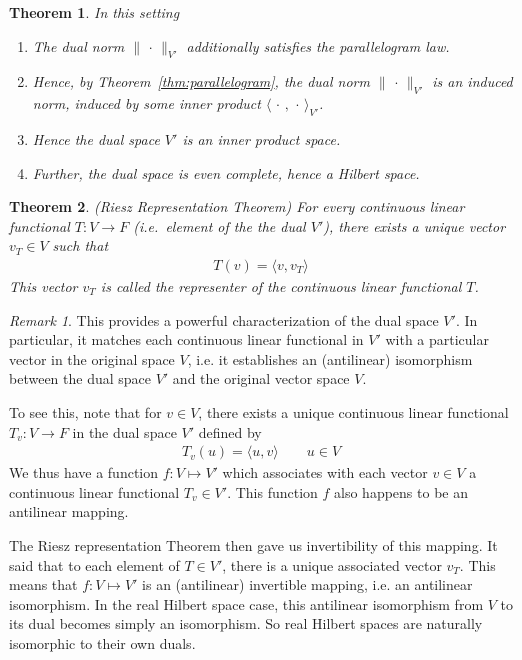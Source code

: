 \documentclass[12pt]{book}
\numberwithin{equation}{section} %
\theoremstyle{plain}
\newtheorem{thm}{Theorem}[section]
\theoremstyle{definition}
\theoremstyle{remark}
\newtheorem*{rmk}{Remark}
\newcommand{\ra}{\rightarrow}
\begin{document}
\begin{thm}
\label{thm:dualnormhilbert}
In this setting
\begin{enumerate}[label=\emph{(\roman*)}]
  \item The dual norm $\lVert \,\cdot\,\rVert_{V'}$ additionally
    satisfies the parallelogram law.
  \item Hence, by Theorem~\ref{thm:parallelogram}, the dual norm
    $\lVert \,\cdot\,\rVert_{V'}$ is an induced norm, induced by some
    inner product
    $\langle \,\cdot\,,\,\cdot\,\rangle_{V'}$.
  \item Hence the dual space $V'$ is an inner product space.

  \item Further, the dual space is even complete, hence a Hilbert space.
\end{enumerate}
\end{thm}



\begin{thm}
\emph{(Riesz Representation Theorem)}
For every continuous linear functional $T:V\ra F$ (i.e.\ element of the
the dual $V'$), there exists a unique vector $v_T\in V$ such that
\begin{align*}
  T(v) = \langle v,v_T\rangle
\end{align*}
This vector $v_T$ is called the \emph{representer} of the continuous
linear functional $T$.
\end{thm}
\begin{rmk}
This provides a powerful characterization of the dual space $V'$.
In particular, it matches each continuous linear functional in $V'$ with
a particular vector in the original space $V$, i.e. it establishes an
(antilinear) isomorphism between the dual space $V'$ and the original
vector space $V$.

To see this, note that for $v \in V$, there exists a unique continuous
linear functional $T_v:V\ra F$ in the dual space $V'$ defined by
\begin{align*}
  T_v(u) = \langle u,v\rangle
  \qquad
  u\in V
\end{align*}
We thus have a function $f:V\mapsto V'$ which associates with each
vector $v\in V$ a continuous linear functional $T_v\in V'$.
This function $f$ also happens to be an antilinear mapping.

The Riesz representation Theorem then gave us invertibility of this
mapping. It said that to each element of $T\in V'$, there is a unique
associated vector $v_T$.
This means that $f:V\mapsto V'$ is an (antilinear) invertible mapping,
i.e. an antilinear isomorphism.
In the real Hilbert space case, this antilinear isomorphism from $V$ to
its dual becomes simply an isomorphism. So real Hilbert spaces are
naturally isomorphic to their own duals.
\end{rmk}
\end{document}
